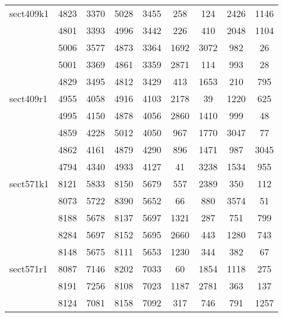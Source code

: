 \documentclass[a4paper, 8pt, envcountsect, runningheads]{article}
\begin{document}
\begin{center}
\begin{longtable}{ |l|c|c|c|c|c|c|c|c| }
	 sect409k1 & 4823 & 3370 & 5028 & 3455 & 258 & 124 & 2426 & 1146 \\
	 
	 & 4801 & 3393 & 4996 & 3442 & 226 & 410 & 2048 & 1104 \\
	 	 
	 & 5006 & 3577 & 4873 & 3364 & 1692 & 3072 & 982 & 26 \\
	 
	 & 5001 & 3369 & 4861 & 3359 & 2871 & 114 & 993 & 28 \\
	 
	 & 4829 & 3495 & 4812 & 3429 & 413 & 1653 & 210 & 795 \\ \hline
	 
	 sect409r1 & 4955 & 4058 & 4916 & 4103 & 2178 & 39 & 1220 & 625 \\
	 
	 & 4995 & 4150 & 4878 & 4056 & 2860 & 1410 & 999 & 48 \\
	 	 
	 & 4859 & 4228 & 5012 & 4050 & 967 & 1770 & 3047 & 77 \\
	 
	 & 4862 & 4161 & 4879 & 4290 & 896 & 1471 & 987 & 3045 \\
	 
	 & 4794 & 4340 & 4933 & 4127 & 41 & 3238 & 1534 & 955 \\ \hline
	 
	 sect571k1 & 8121 & 5833 & 8150 & 5679 & 557 & 2389 & 350 & 112 \\
	 
	 & 8073 & 5722 & 8390 & 5652 & 66 & 880 & 3574 & 51 \\
	 	 
	 & 8188 & 5678 & 8137 & 5697 & 1321 & 287 & 751 & 799 \\
	 
	 & 8284 & 5697 & 8152 & 5695 & 2660 & 443 & 1280 & 743 \\
	 
	 & 8148 & 5675 & 8111 & 5653 & 1230 & 344 & 382 & 67 \\ \hline
	 
	 sect571r1 & 8087 & 7146 & 8202 & 7033 & 60 & 1854 & 1118 & 275 \\
	 
	 & 8191 & 7256 & 8108 & 7023 & 1187 & 2781 & 363 & 137 \\
	 	 
	 & 8124 & 7081 & 8158 & 7092 & 317 & 746 & 791 & 1257 \\
	 

\end{longtable}
\end{center}
\end{document}
